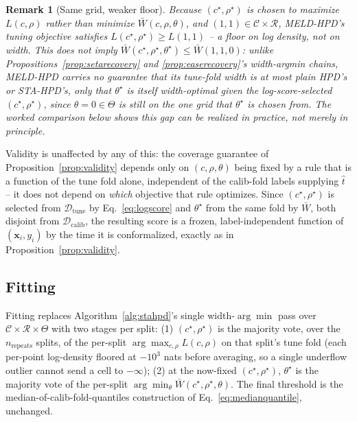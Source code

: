 \documentclass[10pt,twocolumn,a4paper]{article}
\newtheorem{remark}{Remark}
\begin{document}
\begin{remark}[Same grid, weaker floor]
\label{rem:meldweakfloor}
Because $(c^\star,\rho^\star)$ is chosen to maximize $L(c,\rho)$ rather than minimize
$\bar W(c,\rho,\theta)$, and $(1,1)\in\mathcal C\times\mathcal R$, MELD-HPD's tuning objective
satisfies $L(c^\star,\rho^\star)\ge L(1,1)$ -- a floor on \emph{log density}, not on width. This does
\emph{not} imply $\bar W(c^\star,\rho^\star,\theta^\star)\le\bar W(1,1,0)$: unlike
Propositions~\ref{prop:setarecovery} and \ref{prop:easerecovery}'s width-argmin chains, MELD-HPD
carries no guarantee that its tune-fold width is at most plain HPD's or STA-HPD's, only that
$\theta^\star$ is itself width-optimal \emph{given} the log-score-selected $(c^\star,\rho^\star)$,
since $\theta=0\in\Theta$ is still on the one grid that $\theta^\star$ is chosen from. The worked
comparison below shows this gap can be realized in practice, not merely in principle.
\end{remark}

Validity is unaffected by any of this: the coverage guarantee of Proposition~\ref{prop:validity}
depends only on $(c,\rho,\theta)$ being fixed by a rule that is a function of the tune fold alone,
independent of the calib-fold labels supplying $\hat t$ -- it does not depend on \emph{which}
objective that rule optimizes. Since $(c^\star,\rho^\star)$ is selected from $\mathcal D_{\mathrm{tune}}$
by Eq.~\eqref{eq:logscore} and $\theta^\star$ from the same fold by $\bar W$, both disjoint from
$\mathcal D_{\mathrm{calib}}$, the resulting score is a frozen, label-independent function of
$(\bm x_i,y_i)$ by the time it is conformalized, exactly as in Proposition~\ref{prop:validity}.

\subsection{Fitting}
Fitting replaces Algorithm~\ref{alg:stahpd}'s single width-$\arg\min$ pass over
$\mathcal C\times\mathcal R\times\Theta$ with two stages per split: (1) $(c^\star,\rho^\star)$ is the
majority vote, over the $n_{\mathrm{repeats}}$ splits, of the per-split $\arg\max_{c,\rho} L(c,\rho)$
on that split's tune fold (each per-point log-density floored at $-10^3$ nats before averaging, so a
single underflow outlier cannot send a cell to $-\infty$); (2) at the now-fixed $(c^\star,\rho^\star)$,
$\theta^\star$ is the majority vote of the per-split $\arg\min_\theta \bar W(c^\star,\rho^\star,\theta)$.
The final threshold is the median-of-calib-fold-quantiles construction of Eq.~\eqref{eq:medianquantile},
unchanged.
\end{document}
